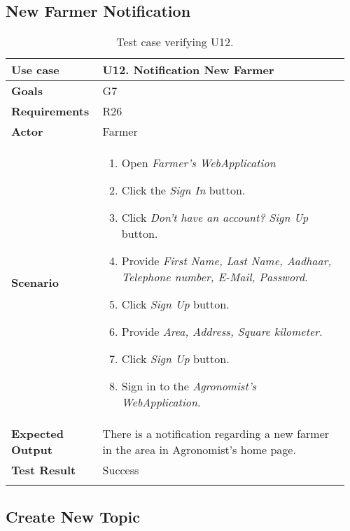 \subsection{New Farmer Notification}
\begin{longtable}{@{}p{0.25\linewidth}p{0.71\linewidth}@{}}
	\toprule
	\textbf{Use case} & \textbf{U12.} Notification New Farmer\\
	\midrule
	\textbf{Goals} & G7\\
	\midrule
	\textbf{Requirements} & R26\\
	\midrule
	\textbf{Actor} & Farmer\\
	\midrule
	\textbf{Scenario} &
	\begin{enumerate}[leftmargin=.4cm,noitemsep,topsep=0pt,before=\vspace{-3mm},after=\vspace{-4mm}]
		\item Open \textit{Farmer's WebApplication}
		\item Click the \textit{Sign In} button.
		\item Click \textit{Don't have an account? Sign Up} button.
		\item Provide \textit{First Name, Last Name, Aadhaar, Telephone number, E-Mail, Password}.
		\item Click \textit{Sign Up} button.
		\item Provide \textit{Area, Address, Square kilometer}.
		\item Click \textit{Sign Up} button.
		\item Sign in to the \textit{Agronomist's WebApplication}.
 	\end{enumerate}\\
	\midrule
	\textbf{Expected Output} & There is a notification regarding a new farmer in the area in Agronomist's home page.\\
	\midrule
	\textbf{Test Result} & Success\\
	\bottomrule
    \caption{Test case verifying U12.}
\end{longtable}


\subsection{Create New Topic}

